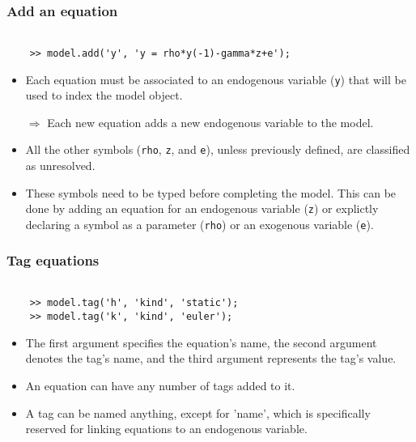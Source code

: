 \documentclass[10pt,slidestop]{beamer}
\theoremstyle{plain}
\begin{document}
\begin{frame}[c,fragile]
  \frametitle{Add an equation}

  \begin{lstlisting}[style=MatlabConsole]

    >> model.add('y', 'y = rho*y(-1)-gamma*z+e');
   \end{lstlisting}

   \bigskip

  \begin{itemize}

  \item Each equation must be associated to an endogenous variable (\verb+y+) that will be used to index the model object.\newline

  \item[$\Rightarrow$] Each new equation adds a new endogenous variable to the model.\newline

  \item All the other symbols (\verb+rho+, \verb+z+, and \verb+e+), unless previously defined, are classified as unresolved.\newline

  \item These symbols need to be typed before completing the model. This can be done by adding an equation for an endogenous variable (\verb+z+) or explictly declaring a symbol as a parameter (\verb+rho+) or an exogenous variable (\verb+e+).

  \end{itemize}

\end{frame}


\begin{frame}[c,fragile]
  \frametitle{Tag equations}

  \begin{lstlisting}[style=MatlabConsole]

    >> model.tag('h', 'kind', 'static');
    >> model.tag('k', 'kind', 'euler');
   \end{lstlisting}

   \bigskip

  \begin{itemize}

  \item The first argument specifies the equation's name, the second
    argument denotes the tag's name, and the third argument represents
    the tag's value.\newline

  \item An equation can have any number of tags added to it.\newline

  \item A tag can be named anything, except for 'name', which is
    specifically reserved for linking equations to an endogenous
    variable.\newline

  \end{itemize}

\end{frame}
\end{document}
